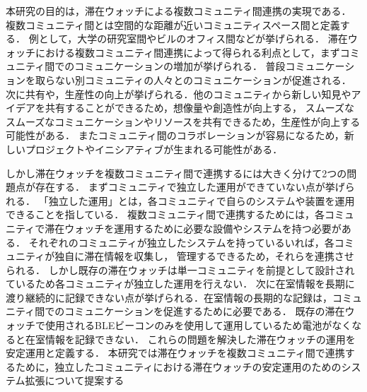 本研究の目的は，滞在ウォッチによる複数コミュニティ間連携の実現である．
複数コミュニティ間とは空間的な距離が近いコミュニティスペース間と定義する．
例として，大学の研究室間やビルのオフィス間などが挙げられる．
滞在ウォッチにおける複数コミュニティ間連携によって得られる利点として，まずコミュニティ間でのコミュニケーションの増加が挙げられる．
普段コミュニケーションを取らない別コミュニティの人々とのコミュニケーションが促進される．
次に共有や，生産性の向上が挙げられる．他のコミュニティから新しい知見やアイデアを共有することができるため，想像量や創造性が向上する，
スムーズなスムーズなコミュニケーションやリソースを共有できるため，生産性が向上する可能性がある．
またコミュニティ間のコラボレーションが容易になるため，新しいプロジェクトやイニシアティブが生まれる可能性がある．

しかし滞在ウォッチを複数コミュニティ間で連携するには大きく分けて2つの問題点が存在する．
まずコミュニティで独立した運用ができていない点が挙げられる．
「独立した運用」とは，各コミュニティで自らのシステムや装置を運用できることを指している．
複数コミュニティ間で連携するためには，各コミュニティで滞在ウォッチを運用するために必要な設備やシステムを持つ必要がある．
それぞれのコミュニティが独立したシステムを持っているいれば，各コミュニティが独自に滞在情報を収集し，
管理するできるため，それらを連携させられる．
しかし既存の滞在ウォッチは単一コミュニティを前提として設計されているため各コミュニティが独立した運用を行えない．
次に在室情報を長期に渡り継続的に記録できない点が挙げられる．在室情報の長期的な記録は，コミュニティ間でのコミュニケーションを促進するために必要である．
既存の滞在ウォッチで使用されるBLEビーコンのみを使用して運用しているため電池がなくなると在室情報を記録できない．
これらの問題を解決した滞在ウォッチの運用を安定運用と定義する．
本研究では滞在ウォッチを複数コミュニティ間で連携するために，独立したコミュニティにおける滞在ウォッチの安定運用のためのシステム拡張について提案する